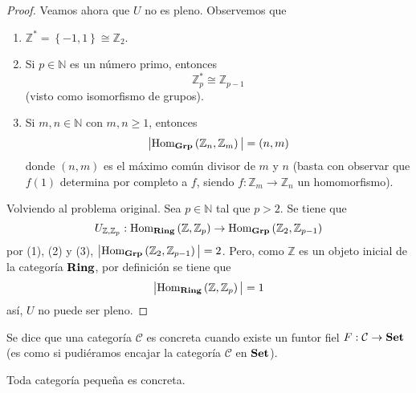 \documentclass[12pt]{report}
\theoremstyle{largebreak}
\newcommand\abs[1]{\ensuremath{\big|#1\big|}}
\newcommand\cf[3]{\ensuremath{#1:#2\rightarrow#3}}
\newcommand{\Hom}[3]{\ensuremath{\textup{Hom}_{#1}\left(#2,#3\right)}}
\newcommand{\Cat}[1]{\ensuremath{\textup{\textbf{#1}}}}
\begin{document}
\begin{proof}
        Veamos ahora que $U$ no es pleno. Observemos que
        \begin{enumerate}
            \item $\mathbb{Z}^*=\left\{-1,1 \right\}\cong\mathbb{Z}_2$.
            \item Si $p\in\mathbb{N}$ es un número primo, entonces
            \begin{equation*}
                \mathbb{Z}_p^*\cong\mathbb{Z}_{ p-1}
            \end{equation*}
            (visto como isomorfismo de grupos).
            \item Si $m,n\in\mathbb{N}$ con $m,n\geq 1$, entonces
            \begin{equation*}
                \abs{\Hom{\Cat{Grp}}{\mathbb{Z}_n}{\mathbb{Z}_m}}=(n,m)
            \end{equation*}
            donde $(n,m)$ es el máximo común divisor de $m$ y $n$ (basta con observar que $f(1)$ determina por completo a $f$, siendo $\cf{f}{\mathbb{Z}_m}{\mathbb{Z}_n}$ un homomorfismo).
        \end{enumerate}
        Volviendo al problema original. Sea $p\in\mathbb{N}$ tal que $p>2$. Se tiene que
        \begin{equation*}
            U_{ \mathbb{Z},\mathbb{Z}_p}:\Hom{\Cat{Ring}}{\mathbb{Z}}{\mathbb{Z}_p}\rightarrow\Hom{\Cat{Grp}}{\mathbb{Z}_2}{\mathbb{Z}_{ p-1}}
        \end{equation*}
        por (1), (2) y (3), $\abs{\Hom{\Cat{Grp}}{\mathbb{Z}_2}{\mathbb{Z}_{ p-1}}}=2$. Pero, como $\mathbb{Z}$ es un objeto inicial de la categoría $\Cat{Ring}$, por definición se tiene que
        \begin{equation*}
            \abs{\Hom{\Cat{Ring}}{\mathbb{Z}}{\mathbb{Z}_p}}=1
        \end{equation*}
        así, $U$ no puede ser pleno.
    \end{proof}

    \begin{mydef}
        Se dice que una categoría $\mathcal{C}$ es concreta cuando existe un funtor fiel $\cf{F}{\mathcal{C}}{\Cat{Set}}$ (es como si pudiéramos encajar la categoría $\mathcal{C}$ en $\Cat{Set}$).
    \end{mydef}

    \begin{propo}
        Toda categoría pequeña es concreta.
    \end{propo}
\end{document}
